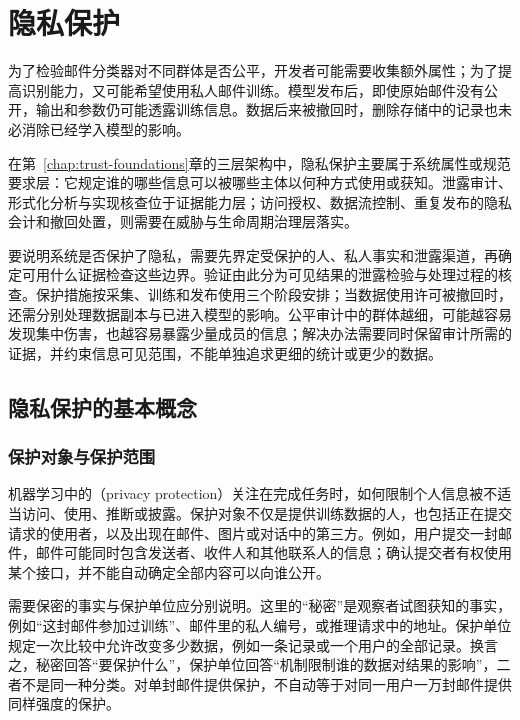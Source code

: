 \chapter{隐私保护}
\label{chap:trust-privacy}

为了检验邮件分类器对不同群体是否公平，开发者可能需要收集额外属性；为了提高识别能力，又可能希望使用私人邮件训练。模型发布后，即使原始邮件没有公开，输出和参数仍可能透露训练信息。数据后来被撤回时，删除存储中的记录也未必消除已经学入模型的影响。

在第~\ref{chap:trust-foundations}章的三层架构中，隐私保护主要属于系统属性或规范要求层：它规定谁的哪些信息可以被哪些主体以何种方式使用或获知。泄露审计、形式化分析与实现核查位于证据能力层；访问授权、数据流控制、重复发布的隐私会计和撤回处置，则需要在威胁与生命周期治理层落实。

要说明系统是否保护了隐私，需要先界定受保护的人、私人事实和泄露渠道，再确定可用什么证据检查这些边界。验证由此分为可见结果的泄露检验与处理过程的核查。保护措施按采集、训练和发布使用三个阶段安排；当数据使用许可被撤回时，还需分别处理数据副本与已进入模型的影响。公平审计中的群体越细，可能越容易发现集中伤害，也越容易暴露少量成员的信息；解决办法需要同时保留审计所需的证据，并约束信息可见范围，不能单独追求更细的统计或更少的数据。

\section{隐私保护的基本概念}
\label{sec:privacy-concepts}

\subsection{保护对象与保护范围}
\label{sec:privacy-subjects}

机器学习中的（privacy protection）关注在完成任务时，如何限制个人信息被不适当访问、使用、推断或披露。保护对象不仅是提供训练数据的人，也包括正在提交请求的使用者，以及出现在邮件、图片或对话中的第三方。例如，用户提交一封邮件，邮件可能同时包含发送者、收件人和其他联系人的信息；确认提交者有权使用某个接口，并不能自动确定全部内容可以向谁公开。

需要保密的事实与保护单位应分别说明。这里的“秘密”是观察者试图获知的事实，例如“这封邮件参加过训练”、邮件里的私人编号，或推理请求中的地址。保护单位规定一次比较中允许改变多少数据，例如一条记录或一个用户的全部记录。换言之，秘密回答“要保护什么”，保护单位回答“机制限制谁的数据对结果的影响”，二者不是同一种分类。对单封邮件提供保护，不自动等于对同一用户一万封邮件提供同样强度的保护。

